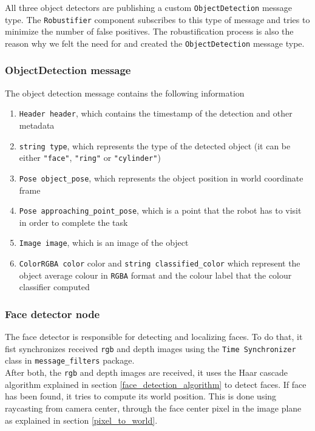 \documentclass[12pt,a4paper]{article}
\begin{document}
	All three object detectors are publishing a custom \texttt{ObjectDetection} message type. The \texttt{Robustifier} component subscribes to this type of message and tries to minimize the number of false positives. The robustification process is also the reason why we felt the need for and created the \texttt{ObjectDetection} message type.
	
	\subsubsection{ObjectDetection message}
	The object detection message contains the following information
	\begin{enumerate}
		\item \texttt{Header header}, which contains the timestamp of the detection and other metadata
		\item \texttt{string type}, which represents the type of the detected object (it can be either \texttt{"face"}, \texttt{"ring"} or \texttt{"cylinder"})
		\item \texttt{Pose object\_pose}, which represents the object position in world coordinate frame
		\item \texttt{Pose approaching\_point\_pose}, which is a point that the robot has to visit in order to complete the task
		\item \texttt{Image image}, which is an image of the object
		\item \texttt{ColorRGBA color} color and \texttt{string classified\_color} which represent the object average colour in \texttt{RGBA} format and the colour label that the colour classifier computed
	\end{enumerate}
	
	\subsubsection{Face detector node}
	The face detector is responsible for detecting and localizing faces. To do that, it fist synchronizes received \texttt{rgb} and depth images using the \texttt{Time Synchronizer} class in \texttt{message\_filters} package. \\

	After both, the \texttt{rgb} and depth images are received, it uses the Haar cascade algorithm explained in section \ref{face_detection_algorithm} to detect faces. If face has been found, it tries to compute its world position. This is done using raycasting from camera center, through the face center pixel in the image plane as explained in section \ref{pixel_to_world}. \\
\end{document}
